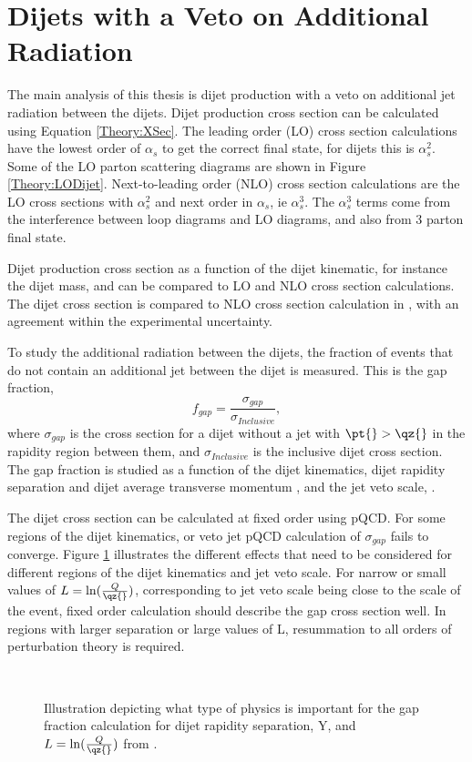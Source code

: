 \section{Dijets with a Veto on Additional Radiation}

The main analysis of this thesis is dijet production with a veto on additional jet radiation between the dijets.
Dijet production cross section can be calculated using Equation \ref{Theory:XSec}.
The leading order (LO) cross section calculations have the lowest order of $\alpha_{s}$ to get the correct final state, for dijets this is $\alpha_{s}^{2}$.
Some of the LO parton scattering diagrams are shown in Figure \ref{Theory:LODijet}.
Next-to-leading order (NLO) cross section calculations are the LO cross sections with $\alpha_{s}^{2}$ and next order in $\alpha_{s}$, ie $\alpha_{s}^{3}$.
The $\alpha_{s}^{3}$ terms come from the interference between loop diagrams and LO diagrams, and also from 3 parton final state.


Dijet production cross section as a function of the dijet kinematic, for instance the dijet mass, and can be compared to LO and NLO cross section calculations.
The dijet cross section is compared to NLO cross section calculation in \cite{ref:Dijet}, with an agreement within the experimental uncertainty.


To study the additional radiation between the dijets, the fraction of events that do not contain an additional jet between the dijet is measured.
This is the gap fraction,
\begin{equation}
f_{gap} = \frac{\sigma_{gap}}{\sigma_{Inclusive}},
\label{Theory:GapFraction}
\end{equation}
where $\sigma_{gap}$ is the cross section for a dijet without a jet with $\pt{}>\qz{}$ in the rapidity region between them, \dr{} and $\sigma_{Inclusive}$ is the inclusive dijet cross section.
The gap fraction is studied as a function of the dijet kinematics, dijet rapidity separation \dy{} and dijet average transverse momentum \ptb{}, and the jet veto scale, \qz{}.

The dijet cross section can be calculated at fixed order using pQCD.
For some regions of the dijet kinematics, or veto jet \pt{} pQCD calculation of $\sigma_{gap}$ fails to converge.
Figure \ref{Theory:KineRange} illustrates the different effects that need to be considered for different regions of the dijet kinematics and jet veto scale.
For narrow \dr{} or small values of $L=\ln(\frac{Q}{\qz{}})$, corresponding to jet veto scale being close to the scale of the event, fixed order calculation should describe the gap cross section well.
In regions with larger separation or large values of L, resummation to all orders of perturbation theory is required.
\begin{figure}
\centering
\mbox{
}
\caption[]{
Illustration depicting what type of physics is important for the gap fraction calculation for dijet rapidity separation, Y, and $L=\ln(\frac{Q}{\qz{}})$ from \cite{ref:Forshaw_Veto}.
\label{Theory:KineRange}}
\end{figure}





